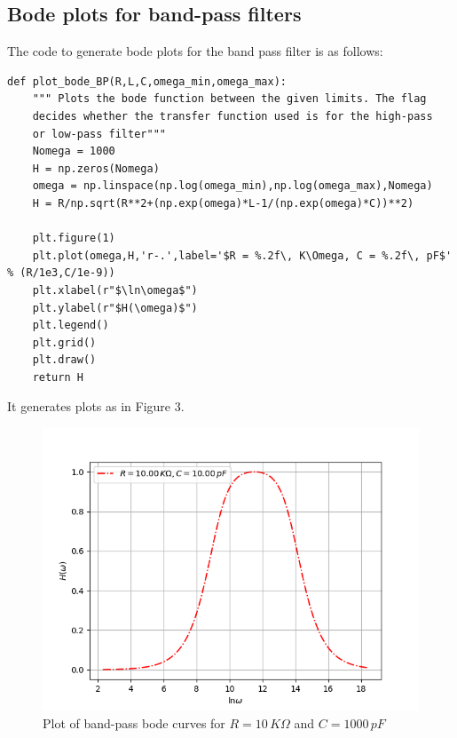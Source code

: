 \documentclass[english]{article}
\begin{document}
\subsection{Bode plots for band-pass filters}
The code to generate bode plots for the band pass filter is as follows:
\begin{lstlisting}
def plot_bode_BP(R,L,C,omega_min,omega_max):
    """ Plots the bode function between the given limits. The flag
    decides whether the transfer function used is for the high-pass 
    or low-pass filter"""
    Nomega = 1000
    H = np.zeros(Nomega)
    omega = np.linspace(np.log(omega_min),np.log(omega_max),Nomega)
    H = R/np.sqrt(R**2+(np.exp(omega)*L-1/(np.exp(omega)*C))**2)
    
    plt.figure(1)
    plt.plot(omega,H,'r-.',label='$R = %.2f\, K\Omega, C = %.2f\, pF$' % (R/1e3,C/1e-9))
    plt.xlabel(r"$\ln\omega$")
    plt.ylabel(r"$H(\omega)$")
    plt.legend()
    plt.grid()
    plt.draw()
    return H
\end{lstlisting}
It generates plots as in Figure 3.
\begin{figure}
	\centering
	\label{fig:bandpass}
	\includegraphics[scale=0.4]{band_pass.png}
	\caption{Plot of band-pass bode curves for $R=10\,K\Omega$ and $C=1000\,pF$}
\end{figure}
\end{document}
